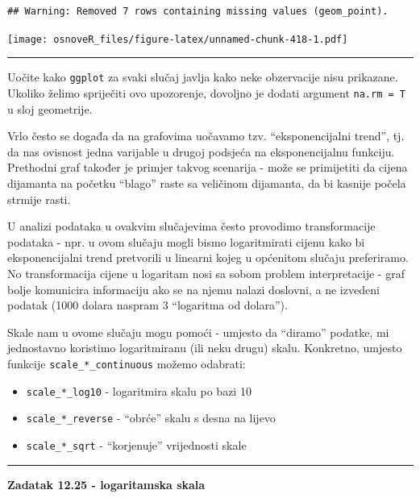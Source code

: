 \documentclass[]{book}
\providecommand{\tightlist}{%
  \setlength{\itemsep}{0pt}\setlength{\parskip}{0pt}}
\theoremstyle{definition}
\theoremstyle{definition}
\theoremstyle{definition}
\theoremstyle{remark}
\begin{document}
\begin{verbatim}
## Warning: Removed 7 rows containing missing values (geom_point).
\end{verbatim}

\texttt{[image: osnoveR\_files/figure-latex/unnamed-chunk-418-1.pdf]}

\begin{center}\rule{0.5\linewidth}{\linethickness}\end{center}

Uočite kako \texttt{ggplot} za svaki slučaj javlja kako neke obzervacije
nisu prikazane. Ukoliko želimo spriječiti ovo upozorenje, dovoljno je
dodati argument \texttt{na.rm\ =\ T} u sloj geometrije.

Vrlo često se događa da na grafovima uočavamo tzv. ``eksponencijalni
trend'', tj. da nas ovisnost jedna varijable u drugoj podsjeća na
eksponencijalnu funkciju. Prethodni graf također je primjer takvog
scenarija - može se primijetiti da cijena dijamanta na početku ``blago''
raste sa veličinom dijamanta, da bi kasnije počela strmije rasti.

U analizi podataka u ovakvim slučajevima često provodimo transformacije
podataka - npr. u ovom slučaju mogli bismo logaritmirati cijenu kako bi
eksponencijalni trend pretvorili u linearni kojeg u općenitom slučaju
preferiramo. No transformacija cijene u logaritam nosi sa sobom problem
interpretacije - graf bolje komunicira informaciju ako se na njemu
nalazi doslovni, a ne izvedeni podatak (1000 dolara naspram 3
``logaritma od dolara'').

Skale nam u ovome slučaju mogu pomoći - umjesto da ``diramo'' podatke,
mi jednostavno koristimo logaritmiranu (ili neku drugu) skalu.
Konkretno, umjesto funkcije \texttt{scale\_*\_continuous} možemo
odabrati:

\begin{itemize}
\tightlist
\item
  \texttt{scale\_*\_log10} - logaritmira skalu po bazi 10
\item
  \texttt{scale\_*\_reverse} - ``obrće'' skalu s desna na lijevo
\item
  \texttt{scale\_*\_sqrt} - ``korjenuje'' vrijednosti skale
\end{itemize}

\begin{center}\rule{0.5\linewidth}{\linethickness}\end{center}

\textbf{Zadatak 12.25 - logaritamska skala}
\end{document}
